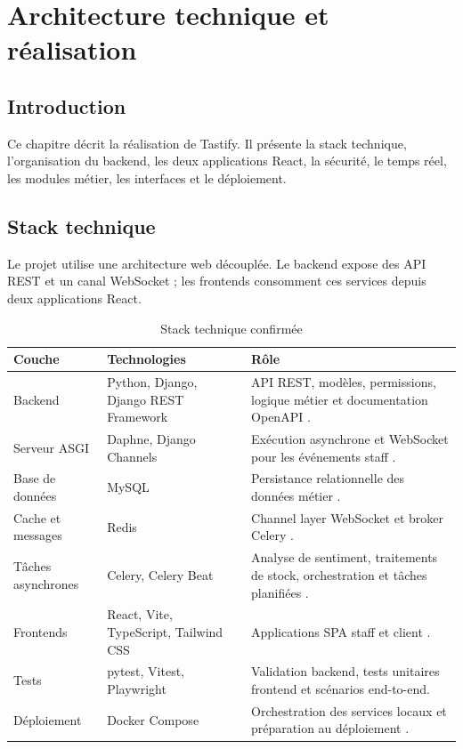 \chapter{Architecture technique et réalisation}
\label{chap:realisation}

\section*{Introduction}
Ce chapitre décrit la réalisation de Tastify. Il présente la stack technique, l'organisation du backend, les deux applications React, la sécurité, le temps réel, les modules métier, les interfaces et le déploiement.

\section{Stack technique}
Le projet utilise une architecture web découplée. Le backend expose des API REST et un canal WebSocket ; les frontends consomment ces services depuis deux applications React.

\begin{table}[H]
\centering
\caption{Stack technique confirmée}
\label{tab:stack}
\begin{tabularx}{\textwidth}{p{3.3cm}p{3.8cm}Y}
\toprule
\textbf{Couche} & \textbf{Technologies} & \textbf{Rôle} \\
\midrule
Backend & Python, Django, Django REST Framework & API REST, modèles, permissions, logique métier et documentation OpenAPI \cite{django,drf}. \\
Serveur ASGI & Daphne, Django Channels & Exécution asynchrone et WebSocket pour les événements staff \cite{channels}. \\
Base de données & MySQL & Persistance relationnelle des données métier \cite{mysql}. \\
Cache et messages & Redis & Channel layer WebSocket et broker Celery \cite{redis}. \\
Tâches asynchrones & Celery, Celery Beat & Analyse de sentiment, traitements de stock, orchestration et tâches planifiées \cite{celery}. \\
Frontends & React, Vite, TypeScript, Tailwind CSS & Applications SPA staff et client \cite{react,vite,tailwind}. \\
Tests & pytest, Vitest, Playwright & Validation backend, tests unitaires frontend et scénarios end-to-end. \\
Déploiement & Docker Compose & Orchestration des services locaux et préparation au déploiement \cite{docker}. \\
\bottomrule
\end{tabularx}
\end{table}

